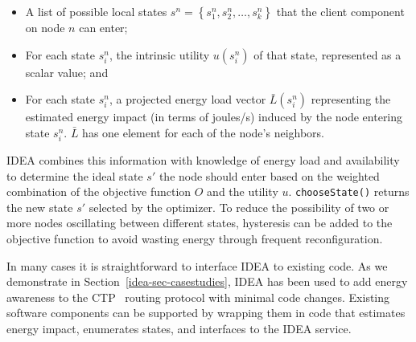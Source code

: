 \begin{itemize}

\item A list of possible local states $s^n = \left\{ s^n_1, s^n_2, \ldots,
s^n_k\right\}$ that the client component on node $n$ can enter;

\item For each state $s^n_i$, the intrinsic utility $u(s^n_i)$ of that state,
represented as a scalar value; and

\item For each state $s^n_i$, a projected energy load vector $\bar{L}(s^n_i)$
representing the estimated energy impact (in terms of joules/s) induced by
the node entering state $s^n_i$. $\bar{L}$ has one element for each of the
node's neighbors.

\end{itemize}

IDEA combines this information with knowledge of energy load and availability
to determine the ideal state $s'$ the node should enter based on the weighted
combination of the objective function $O$ and the utility $u$.
\texttt{chooseState()} returns the new state $s'$ selected by the optimizer.
To reduce the possibility of two or more nodes oscillating between different
states, hysteresis can be added to the objective function to avoid wasting
energy through frequent reconfiguration.

In many cases it is straightforward to interface IDEA to existing code. As we
demonstrate in Section~\ref{idea-sec-casestudies}, IDEA has been used to add
energy awareness to the CTP~\cite{ctp-sensys09} routing protocol with minimal
code changes. Existing software components can be supported by wrapping them
in code that estimates energy impact, enumerates states, and interfaces to
the IDEA service.
